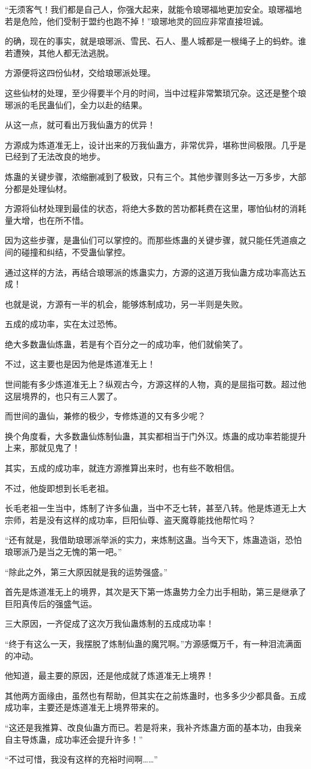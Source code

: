 \begin{this_body}
“无须客气！我们都是自己人，你强大起来，就能令琅琊福地更加安全。琅琊福地若是危险，他们受制于盟约也跑不掉！”琅琊地灵的回应非常直接坦诚。

的确，现在的事实，就是琅琊派、雪民、石人、墨人城都是一根绳子上的蚂蚱。谁若遭殃，其他人都无法逃脱。

方源便将这四份仙材，交给琅琊派处理。

这些仙材的处理，至少得要半个月的时间，当中过程非常繁琐冗杂。这还是整个琅琊派的毛民蛊仙们，全力以赴的结果。

从这一点，就可看出万我仙蛊方的优异！

方源成为炼道准无上，设计出来的万我仙蛊方，非常优异，堪称世间极限。几乎是已经到了无法改良的地步。

炼蛊的关键步骤，浓缩删减到了极致，只有三个。其他步骤则多达一万多步，大部分都是处理仙材。

方源将仙材处理到最佳的状态，将绝大多数的苦功都耗费在这里，哪怕仙材的消耗量大增，也在所不惜。

因为这些步骤，是蛊仙们可以掌控的。而那些炼蛊的关键步骤，就只能任凭道痕之间的碰撞和纠结，不受蛊仙掌控。

通过这样的方法，再结合琅琊派的炼蛊实力，方源的这道万我仙蛊方成功率高达五成！

也就是说，方源有一半的机会，能够炼制成功，另一半则是失败。

五成的成功率，实在太过恐怖。

绝大多数蛊仙炼蛊，若是有个百分之一的成功率，他们就偷笑了。

不过，这主要也是因为他是炼道准无上！

世间能有多少炼道准无上？纵观古今，方源这样的人物，真的是屈指可数。超过他这层境界的，也只有三人罢了。

而世间的蛊仙，兼修的极少，专修炼道的又有多少呢？

换个角度看，大多数蛊仙炼制仙蛊，其实都相当于门外汉。炼蛊的成功率若能提升上来，那就见鬼了！

其实，五成的成功率，就连方源推算出来时，也有些不敢相信。

不过，他旋即想到长毛老祖。

长毛老祖一生当中，炼制了许多仙蛊，当中不乏七转，甚至八转。他是炼道无上大宗师，若是没有这样的成功率，巨阳仙尊、盗天魔尊能找他帮忙吗？

“还有就是，我借助琅琊派举派的实力，来炼制这蛊。当今天下，炼蛊造诣，恐怕琅琊派乃是当之无愧的第一吧。”

“除此之外，第三大原因就是我的运势强盛。”

首先是炼道准无上的境界，其次是天下第一炼蛊势力全力出手相助，第三是继承了巨阳真传后的强盛气运。

三大原因，一齐促成了这次万我仙蛊炼制的五成成功率！

“终于有这么一天，我摆脱了炼制仙蛊的魔咒啊。”方源感慨万千，有一种泪流满面的冲动。

他知道，最主要的原因，还是他成就了炼道准无上境界！

其他两方面缘由，虽然也有帮助，但其实在之前炼蛊时，也多多少少都具备。五成成功率，主要还是炼道准无上境界带来的。

“这还是我推算、改良仙蛊方而已。若是将来，我补齐炼蛊方面的基本功，由我亲自主导炼蛊，成功率还会提升许多！”

“不过可惜，我没有这样的充裕时间啊……”

\end{this_body}

